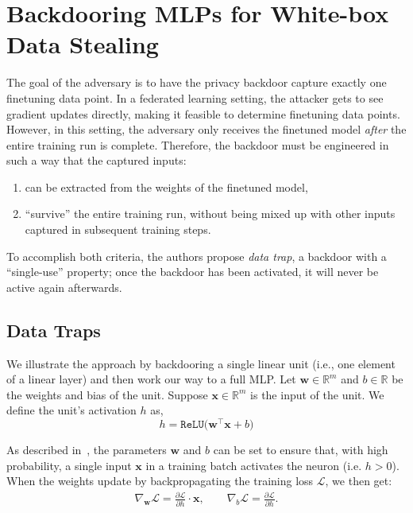 \section{Backdooring MLPs for White-box Data Stealing}
\label{sec:attack}
The goal of the adversary is to have the privacy backdoor capture exactly one finetuning data point. In a federated learning setting, the attacker gets to see gradient updates directly, making it feasible to determine finetuning data points. However, in this setting, the adversary only receives the finetuned model \textit{after} the entire training run is complete. Therefore, the backdoor must be engineered in such a way that the captured inputs: 
\begin{enumerate}[label=(\roman*), leftmargin=*, itemsep=2pt, topsep=2pt]
    \item can be extracted from the weights of the finetuned model,
    \item ``survive'' the entire training run, without being mixed up with other inputs captured in subsequent training steps.
\end{enumerate}

To accomplish both criteria, the authors propose \textit{data trap}, a backdoor with a ``single-use'' property; once the backdoor has been activated, it will never be active again afterwards.

\subsection{Data Traps}
We illustrate the approach by backdooring a single linear unit (i.e., one element of a linear layer) and then work our way to a full MLP. Let $\mathbf{w} \in \mathbb{R}^m$ and $b \in \mathbb{R}$ be the weights and bias of the unit. Suppose $\mathbf{x}\in \mathbb{R}^m$ is the input of the unit. We define the unit's activation $h$ as, 
\begin{equation}
    h = \mathtt{ReLU}\big(\mathbf{w}^\top\mathbf{x} + b \big)
\end{equation}

As described in~\cite{fowl2022robbingfeddirectlyobtaining}, the parameters $\mathbf{w}$ and $b$ can be set to ensure that, with high probability, a single input $\mathbf{x}$ in a training batch activates the neuron (i.e. $h > 0$). When the weights update by backpropagating the training loss $\mathcal{L}$, we then get:
\begin{align}
    \nabla_\mathbf{w} \mathcal{L} = \frac{\partial \mathcal{L}}{\partial h} \cdot \mathbf{x}, \qquad \nabla_b \mathcal{L} = \frac{\partial \mathcal{L}}{\partial h}.
\end{align}

